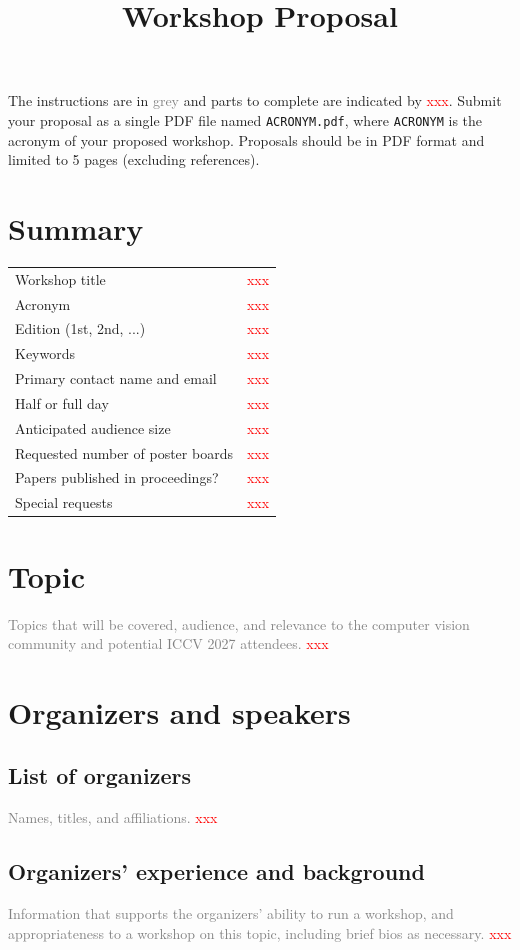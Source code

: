 \documentclass{article}
\title{\conf Workshop Proposal}
\author{}
\date{}
\newcommand\conf{ICCV 2027\xspace}
\def\c#1{\textcolor{gray}{#1}}
\def\x{\textcolor{red}{xxx}}
\begin{document}
\maketitle

The instructions are in \c{grey} and parts to complete are indicated by \x. Submit your proposal as a single PDF file named \texttt{ACRONYM.pdf}, where \texttt{ACRONYM} is the acronym of your proposed workshop. Proposals should be in PDF format and limited to 5 pages (excluding references).

\section{Summary}
\begin{tabular}{ll}
  \hline
  Workshop title & \x \\
  Acronym & \x \\
  Edition (1st, 2nd, ...) & \x \\
  Keywords & \x \\
  Primary contact name and email & \x \\
  Half or full day & \x \\
  Anticipated audience size & \x \\
  Requested number of poster boards & \x \\
  Papers published in proceedings? & \x \\
  Special requests & \x \\
  \hline
\end{tabular}


\section{Topic}
\c{Topics that will be covered, audience, and relevance to the computer vision community and potential \conf attendees.}
\x


\section{Organizers and speakers}
\subsection{List of organizers}
\c{Names, titles, and affiliations.}
\x
\subsection{Organizers' experience and background}
\c{Information that supports the organizers' ability to run a workshop, and appropriateness to a workshop on this topic, including brief bios as necessary.}
\x
\end{document}
